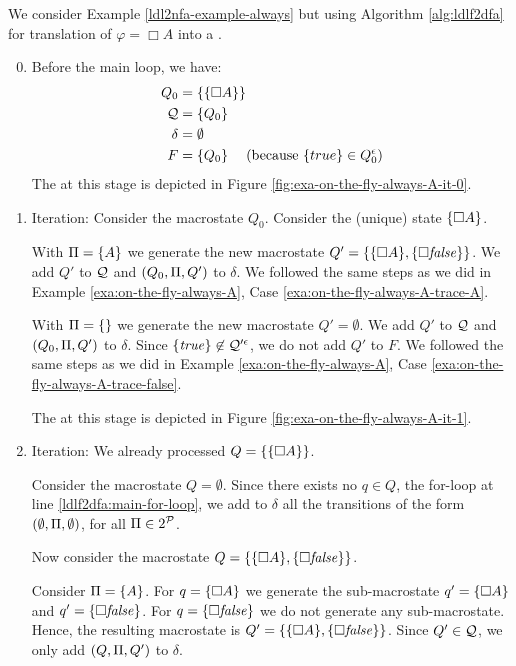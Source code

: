 \begin{example}
	We consider Example \ref{ldl2nfa-example-always} but using Algorithm \ref{alg:ldlf2dfa} for translation of $\varphi = \Box A$ into a \DFA.
	
	\begin{enumerate}
		\setcounter{enumi}{-1}
		\item Before the main loop, we have:
			\begin{align*}
			Q_0 &= \{\{\Box A\}\}\\
			\mathcal{Q}  &= \{Q_0\}\\
			\delta &= \emptyset\\
			F &= \{Q_0\} \hspace*{.18in} (\text{because } \{true\}\in Q_0^\epsilon)
			\end{align*}
		The \DFA at this stage is depicted in Figure \ref{fig:exa-on-the-fly-always-A-it-0}.
		
		\item Iteration: Consider the macrostate $Q_0$. Consider the (unique) \NFA state $\{\Box A\}$. 
		
		With $\Pi = \{A\}$ we generate the new macrostate $Q' = \{\{\Box A\}, \{\Box \mathit{false}\}\}$. We add $Q'$ to $\mathcal{Q}$ and $(Q_0, \Pi, Q')$ to $\delta$. We followed the same steps as we did in Example \ref{exa:on-the-fly-always-A}, Case \ref{exa:on-the-fly-always-A-trace-A}.
		
		With $\Pi = \{\}$ we generate the new macrostate $Q' =\emptyset$.  We add $Q'$ to $\mathcal{Q}$ and $(Q_0, \Pi, Q')$ to $\delta$. Since $\{\mathit{true}\}\not\in\mathcal{Q}'^\epsilon$, we do not add $Q'$ to $F$. We followed the same steps as we did in Example \ref{exa:on-the-fly-always-A}, Case \ref{exa:on-the-fly-always-A-trace-false}.
		
		\medskip
		
		The \DFA at this stage is depicted in Figure \ref{fig:exa-on-the-fly-always-A-it-1}.
		
		\item Iteration: We already processed $Q=\{\{\Box A\}\}$.
		
		Consider the macrostate $Q = \emptyset$. Since there exists no $q\in Q$, the for-loop at line \ref{ldlf2dfa:main-for-loop}, we add to $\delta$ all the transitions of the form $(\emptyset, \Pi, \emptyset)$, for all $\Pi \in 2^{\mathcal{P}}$.
 
		 Now consider the macrostate $Q = \{\{\Box A\}, \{\Box \mathit{false}\}\}$. 
		
		Consider $\Pi = \{A\}$. For $q = \{\Box A\}$ we generate the sub-macrostate $q' = \{\Box A\}$ and $q' = \{\Box \mathit{false}\}$. For $q = \{\Box \mathit{false}\}$ we do not generate any sub-macrostate.
		Hence, the resulting macrostate is $Q' = \{\{\Box A\}, \{\Box \mathit{false}\}\}$. Since $Q'\in \mathcal{Q}$, we only add $(Q, \Pi, Q')$ to $\delta$.
		

\end{enumerate}
\end{example}
